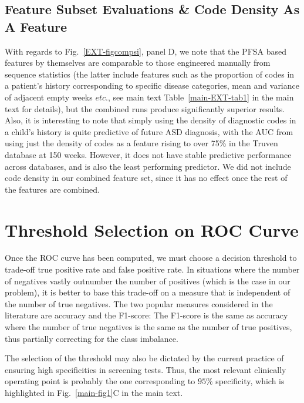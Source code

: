 \documentclass[onecolumn,,10pt]{IEEEtran}
\begin{document}


\tikzexternalenable

  
\subsection{Feature Subset Evaluations \& Code Density As A Feature}\label{subsec:features}
With regards to Fig.~\ref{EXT-figcompsi}, panel D, we note that the PFSA based features by themselves are comparable to those engineered manually from sequence statistics (the latter include  features such as the proportion of  codes in a patient's history corresponding to specific  disease categories, mean and variance of adjacent empty weeks $etc.$, see main text Table~\ref{main-EXT-tab1} in the main text for details), but the combined runs produce significantly superior results.
Also, it is interesting to note that simply using the density of diagnostic codes in a child's history is quite predictive of future ASD diagnosis, with the AUC from using just the density of codes as a feature rising to over 75\% in the Truven database at 150 weeks. However, it does not have stable predictive performance across databases, and is also the least performing predictor. We did not include code density in our combined feature set, since it has no effect once the rest of the features are combined.

\section{Threshold Selection on ROC Curve}\label{sec:F1}
Once the ROC curve has been computed, we must choose a decision threshold to trade-off true positive rate and false positive rate.
In situations where the number of negatives vastly outnumber the number of positives (which is the case in our problem), it is better to base this trade-off on a measure that is independent of the number of true negatives. The two popular measures considered in the literature  are accuracy and the F1-score:
The F1-score is the same as accuracy where  the number of true negatives is the same as the number of true positives, thus partially correcting for the class imbalance.

The selection of the threshold may also be dictated by the current practice of ensuring high specificities in screening tests. Thus, the most relevant clinically  operating point  is probably the one corresponding to $95\%$ specificity, which is highlighted in Fig.~\ref{main-fig1}C in the main text.
\end{document}
